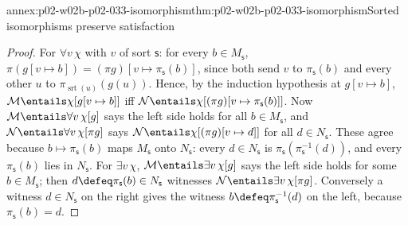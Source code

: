\begin{annexitem}{annex:p02-w02b-p02-033-isomorphism}{thm:p02-w02b-p02-033-isomorphism}{Sorted isomorphisms preserve satisfaction}
\begin{proof}
For \(\forall v\,\chi\) with \(v\) of sort \(\mathsf s\): for every
\(b\in M_{\mathsf s}\), \(\pi(g[v\mapsto b])=(\pi g)[v\mapsto\pi_{\mathsf s}(b)]\),
since both send \(v\) to \(\pi_{\mathsf s}(b)\) and every other \(u\) to
\(\pi_{\operatorname{srt}(u)}(g(u))\).  Hence, by the induction hypothesis at
\(g[v\mapsto b]\),
\(\mathcal M\entails\chi[g[v\mapsto b]]\) iff
\(\mathcal N\entails\chi[(\pi g)[v\mapsto\pi_{\mathsf s}(b)]]\).  Now
\(\mathcal M\entails\forall v\,\chi[g]\) says the left side holds for all
\(b\in M_{\mathsf s}\), and \(\mathcal N\entails\forall v\,\chi[\pi g]\) says
\(\mathcal N\entails\chi[(\pi g)[v\mapsto d]]\) for all \(d\in N_{\mathsf s}\).
These agree because \(b\mapsto\pi_{\mathsf s}(b)\) maps \(M_{\mathsf s}\)
onto \(N_{\mathsf s}\): every \(d\in N_{\mathsf s}\) is
\(\pi_{\mathsf s}(\pi_{\mathsf s}^{-1}(d))\), and every
\(\pi_{\mathsf s}(b)\) lies in \(N_{\mathsf s}\).  For \(\exists v\,\chi\),
\(\mathcal M\entails\exists v\,\chi[g]\) says the left side holds for some
\(b\in M_{\mathsf s}\); then \(d\defeq\pi_{\mathsf s}(b)\in N_{\mathsf s}\)
witnesses \(\mathcal N\entails\exists v\,\chi[\pi g]\).  Conversely a
witness \(d\in N_{\mathsf s}\) on the right gives the witness
\(b\defeq\pi_{\mathsf s}^{-1}(d)\) on the left, because
\(\pi_{\mathsf s}(b)=d\).
\end{proof}
\end{annexitem}

